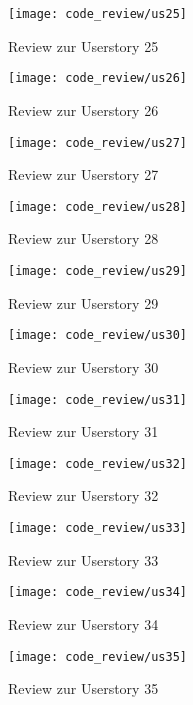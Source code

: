 \begin{figure}[H]
\centering
\texttt{[image: code\_review/us25]}
\caption{Review zur Userstory 25}
\end{figure}

\begin{figure}[H]
\centering
\texttt{[image: code\_review/us26]}
\caption{Review zur Userstory 26}
\end{figure}

\begin{figure}[H]
\centering
\texttt{[image: code\_review/us27]}
\caption{Review zur Userstory 27}
\end{figure}

\begin{figure}[H]
\centering
\texttt{[image: code\_review/us28]}
\caption{Review zur Userstory 28}
\end{figure}

\begin{figure}[H]
\centering
\texttt{[image: code\_review/us29]}
\caption{Review zur Userstory 29}
\end{figure}

\begin{figure}[H]
\centering
\texttt{[image: code\_review/us30]}
\caption{Review zur Userstory 30}
\end{figure}

\begin{figure}[H]
\centering
\texttt{[image: code\_review/us31]}
\caption{Review zur Userstory 31}
\end{figure}

\begin{figure}[H]
\centering
\texttt{[image: code\_review/us32]}
\caption{Review zur Userstory 32}
\end{figure}

\begin{figure}[H]
\centering
\texttt{[image: code\_review/us33]}
\caption{Review zur Userstory 33}
\end{figure}

\begin{figure}[H]
\centering
\texttt{[image: code\_review/us34]}
\caption{Review zur Userstory 34}
\end{figure}

\begin{figure}[H]
\centering
\texttt{[image: code\_review/us35]}
\caption{Review zur Userstory 35}
\end{figure}


